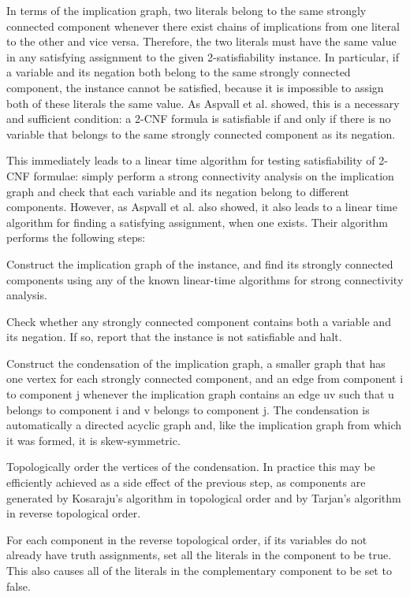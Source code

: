 In terms of the implication graph, two literals belong to the same strongly connected component whenever there exist chains of implications from one literal to the other and vice versa. Therefore, the two literals must have the same value in any satisfying assignment to the given 2-satisfiability instance. In particular, if a variable and its negation both belong to the same strongly connected component, the instance cannot be satisfied, because it is impossible to assign both of these literals the same value. As Aspvall et al. showed, this is a necessary and sufficient condition: a 2-CNF formula is satisfiable if and only if there is no variable that belongs to the same strongly connected component as its negation.

This immediately leads to a linear time algorithm for testing satisfiability of 2-CNF formulae: simply perform a strong connectivity analysis on the implication graph and check that each variable and its negation belong to different components. However, as Aspvall et al. also showed, it also leads to a linear time algorithm for finding a satisfying assignment, when one exists. Their algorithm performs the following steps:

Construct the implication graph of the instance, and find its strongly connected components using any of the known linear-time algorithms for strong connectivity analysis.

Check whether any strongly connected component contains both a variable and its negation. If so, report that the instance is not satisfiable and halt.

Construct the condensation of the implication graph, a smaller graph that has one vertex for each strongly connected component, and an edge from component i to component j whenever the implication graph contains an edge uv such that u belongs to component i and v belongs to component j. The condensation is automatically a directed acyclic graph and, like the implication graph from which it was formed, it is skew-symmetric.

Topologically order the vertices of the condensation. In practice this may be efficiently achieved as a side effect of the previous step, as components are generated by Kosaraju's algorithm in topological order and by Tarjan's algorithm in reverse topological order.

For each component in the reverse topological order, if its variables do not already have truth assignments, set all the literals in the component to be true. This also causes all of the literals in the complementary component to be set to false.

